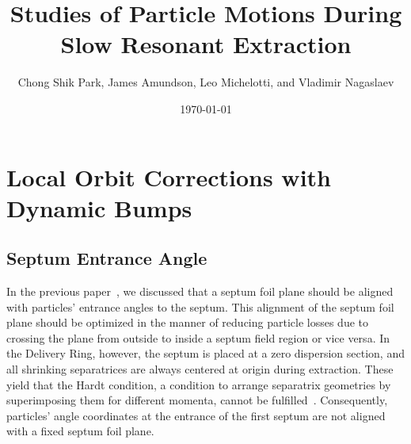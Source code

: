 \documentclass[aps,prstab,onecolumn,preprint,endfloats,11pt]{revtex4-1}
\begin{document}
\title{Studies of Particle Motions During Slow Resonant Extraction}
\author{Chong Shik Park, James Amundson, Leo Michelotti, and Vladimir Nagaslaev}
\date{\today}

\begin{abstract}

\end{abstract}

\pacs{}

\setcounter{tocdepth}{7}





\section{\label{sec:bump}Local Orbit Corrections with Dynamic Bumps}

\subsection{\label{sec:bump0}Septum Entrance Angle}

In the previous paper~\cite{mu2e}, we discussed that a septum foil plane should be aligned with particles' entrance angles to the septum.
This alignment of the septum foil plane should be optimized in the manner of reducing particle losses due to crossing the plane from outside to inside a septum field region or vice versa.
In the Delivery Ring, however, the septum is placed at a zero dispersion section, and all shrinking separatrices are always centered at origin during extraction.
These yield that the Hardt condition, a condition to arrange separatrix geometries by superimposing them for different momenta, cannot be fulfilled~\cite{m.pullia}.
Consequently, particles' angle coordinates at the entrance of the first septum are not aligned with a fixed septum foil plane.
\end{document}
